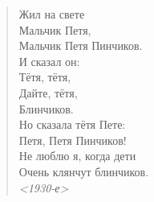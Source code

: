 \begin{center}
\begin{minipage}{0.7\textwidth}
\begin{verse}
\obeylines
\vspace{1em}
Жил на свете \\
Мальчик Петя, \\
Мальчик Петя Пинчиков. \\
И сказал он: \\
Тётя, тётя, \\
Дайте, тётя, \\
Блинчиков. \\

\vspace{0.5em}
Но сказала тётя Пете: \\
Петя, Петя Пинчиков! \\
Не люблю я, когда дети \\
Очень клянчут блинчиков. \\

\vspace{0.5em}
\null\hfill \emph{<1930-е>}
\vspace{1em}

\end{verse}
\end{minipage}
\end{center}